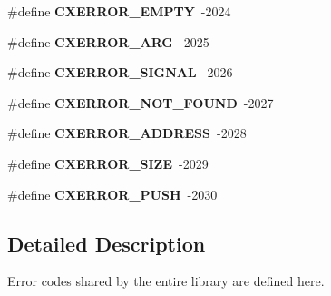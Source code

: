 \begin{DoxyCompactItemize}
\#define {\bfseries C\+X\+E\+R\+R\+O\+R\+\_\+\+E\+M\+P\+TY}~-\/2024
\item 
\mbox{\label{a00008_a4ccd3f7805126c885e383fb35abf57f6}} 
\#define {\bfseries C\+X\+E\+R\+R\+O\+R\+\_\+\+A\+RG}~-\/2025
\item 
\mbox{\label{a00008_a19b6c0e8af74f2867b458cf68be6eb23}} 
\#define {\bfseries C\+X\+E\+R\+R\+O\+R\+\_\+\+S\+I\+G\+N\+AL}~-\/2026
\item 
\mbox{\label{a00008_a658279061a52324f85003fd97afb154c}} 
\#define {\bfseries C\+X\+E\+R\+R\+O\+R\+\_\+\+N\+O\+T\+\_\+\+F\+O\+U\+ND}~-\/2027
\item 
\mbox{\label{a00008_a49e8e2410fe21c65f3bc858087f514f3}} 
\#define {\bfseries C\+X\+E\+R\+R\+O\+R\+\_\+\+A\+D\+D\+R\+E\+SS}~-\/2028
\item 
\mbox{\label{a00008_a7512de878ea8479d3dd2f9c1efe35861}} 
\#define {\bfseries C\+X\+E\+R\+R\+O\+R\+\_\+\+S\+I\+ZE}~-\/2029
\item 
\mbox{\label{a00008_a5d322d3ae6c6f0308125734673619399}} 
\#define {\bfseries C\+X\+E\+R\+R\+O\+R\+\_\+\+P\+U\+SH}~-\/2030
\end{DoxyCompactItemize}


\subsection{Detailed Description}
Error codes shared by the entire library are defined here. 

